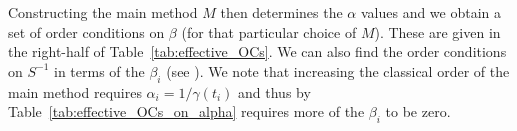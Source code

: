 \documentclass[final]{siamltex}  %
\begin{document}
Constructing the main method $M$ then determines the $\alpha$ values
and we obtain a set of order conditions on $\beta$ (for that
particular choice of $M$).  These are given in the right-half of
Table~\ref{tab:effective_OCs}.
We can also find the order conditions on $S^{-1}$ in terms of the
$\beta_i$ (see \cite[Table~386(III)]{Butcher2008_book}).
We note that increasing the classical order of the main method requires 
$\alpha_i = 1/\gamma(t_i)$ and thus by Table~\ref{tab:effective_OCs_on_alpha} requires more of the $\beta_i$ to be zero.
\end{document}

